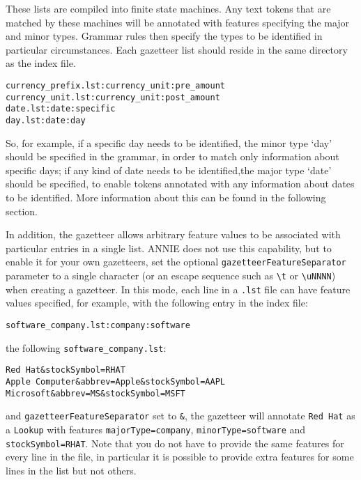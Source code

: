 These lists are compiled into finite state machines. Any text tokens
that are matched by these machines will be annotated with features
specifying the major and minor types. Grammar rules then specify
the types to be identified in particular circumstances. Each 
gazetteer list should reside in the same directory as the index 
file.

\begin{small}
\begin{verbatim}
currency_prefix.lst:currency_unit:pre_amount
currency_unit.lst:currency_unit:post_amount
date.lst:date:specific
day.lst:date:day
\end{verbatim}
\end{small}

So, for example, if a specific day needs to be identified, the minor
type `day' should be specified in the grammar, in order to match 
only information about specific days; if any kind of date needs to be
identified,the major type `date' should be specified, to enable tokens
annotated with any information about dates to be identified. More
information about this can be found in the following section.

In addition, the gazetteer allows arbitrary feature values to be associated
with particular entries in a single list.  ANNIE does not use this capability,
but to enable it for your own gazetteers, set the optional
{\tt gazetteerFeatureSeparator} parameter to a single character (or an escape
sequence such as \verb|\t| or \verb|\uNNNN|) when creating a gazetteer.  In
this mode, each line in a {\tt .lst} file can have feature values specified,
for example, with the following entry in the index file:
\begin{small}\begin{verbatim}
software_company.lst:company:software
\end{verbatim}\end{small}
%
the following \verb|software_company.lst|:
\begin{small}\begin{verbatim}
Red Hat&stockSymbol=RHAT
Apple Computer&abbrev=Apple&stockSymbol=AAPL
Microsoft&abbrev=MS&stockSymbol=MSFT
\end{verbatim}\end{small}
%
and {\tt gazetteerFeatureSeparator} set to \verb|&|, the gazetteer will
annotate \verb|Red Hat| as a \verb|Lookup| with features
\verb|majorType=company|, \verb|minorType=software| and
\verb|stockSymbol=RHAT|.  Note that you do not have to provide the same
features for every line in the file, in particular it is possible to provide
extra features for some lines in the list but not others.

